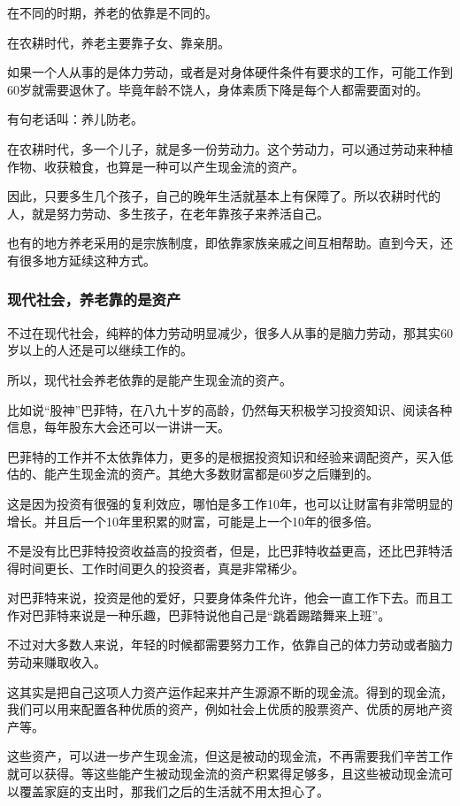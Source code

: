 在不同的时期，养老的依靠是不同的。

在农耕时代，养老主要靠子女、靠亲朋。

如果一个人从事的是体力劳动，或者是对身体硬件条件有要求的工作，可能工作到60岁就需要退休了。毕竟年龄不饶人，身体素质下降是每个人都需要面对的。

有句老话叫：养儿防老。

在农耕时代，多一个儿子，就是多一份劳动力。这个劳动力，可以通过劳动来种植作物、收获粮食，也算是一种可以产生现金流的资产。

因此，只要多生几个孩子，自己的晚年生活就基本上有保障了。所以农耕时代的人，就是努力劳动、多生孩子，在老年靠孩子来养活自己。

也有的地方养老采用的是宗族制度，即依靠家族亲戚之间互相帮助。直到今天，还有很多地方延续这种方式。

\subsubsection{现代社会，养老靠的是资产}

不过在现代社会，纯粹的体力劳动明显减少，很多人从事的是脑力劳动，那其实60岁以上的人还是可以继续工作的。

所以，现代社会养老依靠的是能产生现金流的资产。

比如说“股神”巴菲特，在八九十岁的高龄，仍然每天积极学习投资知识、阅读各种信息，每年股东大会还可以一讲讲一天。

巴菲特的工作并不太依靠体力，更多的是根据投资知识和经验来调配资产，买入低估的、能产生现金流的资产。其绝大多数财富都是60岁之后赚到的。

这是因为投资有很强的复利效应，哪怕是多工作10年，也可以让财富有非常明显的增长。并且后一个10年里积累的财富，可能是上一个10年的很多倍。

不是没有比巴菲特投资收益高的投资者，但是，比巴菲特收益更高，还比巴菲特活得时间更长、工作时间更久的投资者，真是非常稀少。

对巴菲特来说，投资是他的爱好，只要身体条件允许，他会一直工作下去。而且工作对巴菲特来说是一种乐趣，巴菲特说他自己是“跳着踢踏舞来上班”。

不过对大多数人来说，年轻的时候都需要努力工作，依靠自己的体力劳动或者脑力劳动来赚取收入。

这其实是把自己这项人力资产运作起来并产生源源不断的现金流。得到的现金流，我们可以用来配置各种优质的资产，例如社会上优质的股票资产、优质的房地产资产等。

这些资产，可以进一步产生现金流，但这是被动的现金流，不再需要我们辛苦工作就可以获得。等这些能产生被动现金流的资产积累得足够多，且这些被动现金流可以覆盖家庭的支出时，那我们之后的生活就不用太担心了。

